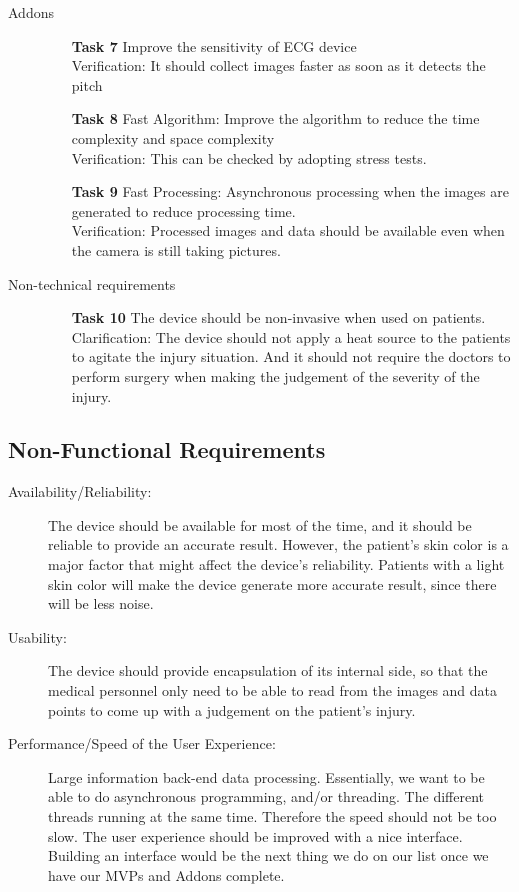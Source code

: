 \documentclass[paper=letter, fontsize=11pt]{scrartcl}
\numberwithin{equation}{section}		%
\numberwithin{figure}{section}			%
\numberwithin{table}{section}			%
\begin{document}
\begin{description}
  \item[Addons] \hspace{1cm}
  	\begin{itemize}
   	\item[\textbf{Task 7}] Improve the sensitivity of ECG device\\
	\hfill Verification: It should collect images faster as soon as it detects the pitch \\
	\item[\textbf{Task 8}] Fast Algorithm: Improve the algorithm to reduce the time complexity and space complexity \\
	\hfill Verification: This can be checked by adopting stress tests.
	\item[\textbf{Task 9}] Fast Processing: Asynchronous processing when the images are generated to reduce processing time.\\
   	\hfill Verification: Processed images and data should be available even when the camera is still taking pictures.
	\end{itemize}
	
  \item[Non-technical requirements]\hspace{1cm}
  	\begin{itemize}
	\item[\textbf{Task 10}] The device should be non-invasive when used on patients. \\
	\hfill Clarification: The device should not apply a heat source to the patients to agitate the injury situation. And it should not require the doctors to perform surgery when making the judgement of the severity of the injury.
	\end{itemize}
\end{description}

\subsection{Non-Functional Requirements}
 \begin{description}
  	\item[Availability/Reliability:]
	The device should be available for most of the time, and it should be reliable to provide an accurate result. However, the patient's skin color is a major factor that might affect the device's reliability. Patients with a light skin color will make the device generate more accurate result, since there will be less noise.
	\item[Usability:]
	The device should provide encapsulation of its internal side, so that the medical personnel only need to be able to read from the images and data points to come up with a judgement on the patient's injury.
	\item[Performance/Speed of the User Experience:]
	Large information back-end data processing. Essentially, we want to be able to do asynchronous programming, and/or threading. The different threads running at the same time. Therefore the speed should not be too slow. The user experience should be improved with a nice interface. Building an interface would be the next thing we do on our list once we have our MVPs and Addons complete.
\end{description}
\end{document}
